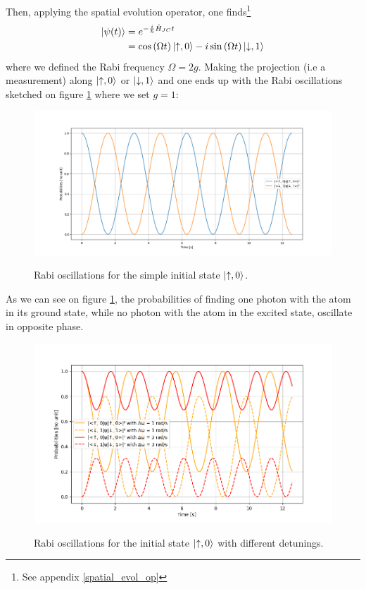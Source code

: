 \documentclass[11pt]{report}
\DeclarePairedDelimiter\ket{\lvert}{\rangle}
\begin{document}
Then, applying the spatial evolution operator, one finds\footnote{See appendix \ref{spatial_evol_op}}
\begin{align}
\ket{\psi(t)} &= e^{-\frac{i}{\hbar}\hat{H}_{JC}t}\\
&= \cos\left(\Omega t\right) \ket{\uparrow, 0} - i \sin\left(\Omega t\right) \ket{\downarrow, 1}
\end{align}
where we defined the Rabi frequency $\Omega = 2g$. Making the projection (i.e a measurement) along $\ket{\uparrow, 0}$ or $\ket{\downarrow, 1}$ and one ends up with the Rabi oscillations sketched on figure  \ref{fig:rabi-no-delta} where we set $g=1$:

\begin{figure}[h]
\caption{Rabi oscillations for the simple initial state $\ket{\uparrow, 0}$.}
\centering
\includegraphics[width=\textwidth]{rabi-no-delta}
\label{fig:rabi-no-delta}
\end{figure}

As we can see on figure \ref{fig:rabi-no-delta}, the probabilities of finding one photon with the atom in its ground state, while no photon with the atom in the excited state, oscillate in opposite phase.

\begin{figure}[h!]
\caption{Rabi oscillations for the initial state $\ket{\uparrow, 0}$ with different detunings.}
\centering
\includegraphics[width=\textwidth]{rabi-prog-delta}
\label{fig:rabi-prog-delta}
\end{figure}
\end{document}
